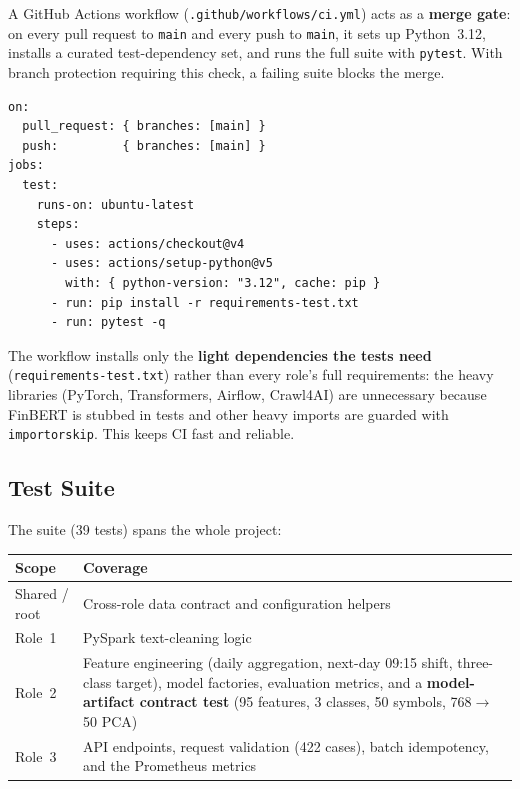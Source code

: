 \documentclass[11pt,a4paper]{article}
\begin{document}
A GitHub Actions workflow (\texttt{.github/workflows/ci.yml}) acts as a
\textbf{merge gate}: on every pull request to \texttt{main} and every push to
\texttt{main}, it sets up Python~3.12, installs a curated test-dependency set,
and runs the full suite with \texttt{pytest}. With branch protection requiring
this check, a failing suite blocks the merge.

\begin{lstlisting}[style=yaml, caption={CI workflow (abridged)}]
on:
  pull_request: { branches: [main] }
  push:         { branches: [main] }
jobs:
  test:
    runs-on: ubuntu-latest
    steps:
      - uses: actions/checkout@v4
      - uses: actions/setup-python@v5
        with: { python-version: "3.12", cache: pip }
      - run: pip install -r requirements-test.txt
      - run: pytest -q
\end{lstlisting}

The workflow installs only the \textbf{light dependencies the tests need}
(\texttt{requirements-test.txt}) rather than every role's full requirements: the
heavy libraries (PyTorch, Transformers, Airflow, Crawl4AI) are unnecessary
because FinBERT is stubbed in tests and other heavy imports are guarded with
\texttt{importorskip}. This keeps CI fast and reliable.

\subsection{Test Suite}

The suite (39 tests) spans the whole project:

\begin{table}[H]
\centering
\begin{tabular}{@{}lp{8.5cm}@{}}
\toprule
\textbf{Scope} & \textbf{Coverage} \\
\midrule
Shared / root & Cross-role data contract and configuration helpers \\
Role~1 & PySpark text-cleaning logic \\
Role~2 & Feature engineering (daily aggregation, next-day 09:15 shift,
  three-class target), model factories, evaluation metrics, and a
  \textbf{model-artifact contract test} (95 features, 3 classes, 50 symbols,
  768$\to$50 PCA) \\
Role~3 & API endpoints, request validation (422 cases), batch idempotency,
  and the Prometheus metrics \\
\bottomrule
\end{tabular}
\end{table}
\end{document}
